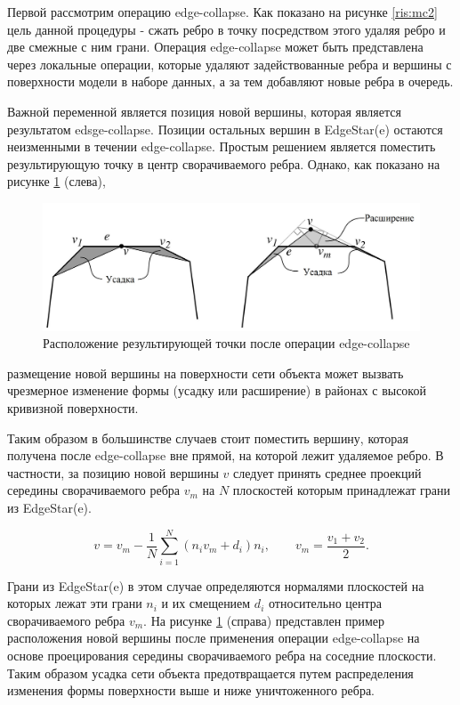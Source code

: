 \documentclass[14pt]{article}
\numberwithin{figure}{section}
\numberwithin{equation}{section}
\begin{document}
Первой рассмотрим операцию edge-collapse. Как показано на рисунке \ref{ris:mc2} цель данной процедуры - сжать ребро в точку посредством этого удаляя ребро и две смежные с ним грани. Операция edge-collapse может быть представлена через локальные операции, которые удаляют задействованные ребра и вершины с поверхности модели в наборе данных, а за тем добавляют новые ребра в очередь.

Важной переменной является позиция новой вершины, которая является результатом edsge-collapse. Позиции остальных вершин в EdgeStar(e) остаются неизменными в течении edge-collapse. Простым решением является поместить результирующую точку в центр сворачиваемого ребра. Однако, как показано на рисунке \ref{ris:mc5} (слева),
\begin{figure}[h]
	\begin{center}
		\includegraphics[scale = 0.47]{mc5.JPG}
		\caption{Расположение результирующей точки после операции edge-collapse}
		\label{ris:mc5}
	\end{center}
\end{figure}
размещение новой вершины на поверхности сети объекта может вызвать чрезмерное изменение формы (усадку или расширение) в районах с высокой кривизной поверхности.

Таким образом в большинстве случаев стоит поместить вершину, которая получена после edge-collapse вне прямой, на которой лежит удаляемое ребро. В частности, за позицию новой вершины $v$ следует принять среднее проекций середины сворачиваемого ребра $v_m$ на $N$ плоскостей которым принадлежат грани из EdgeStar(e).

\begin{equation}
	v = v_m - \frac{1}{N} \sum\limits_{i = 1}^N (n_i v_m + d_i)n_i, \qquad v_m = \frac{v_1 + v_2}{2}.
\end{equation}

Грани из EdgeStar(e) в этом случае определяются нормалями плоскостей на которых лежат эти грани $n_i$ и их смещением $d_i$ относительно центра сворачиваемого ребра $v_m$. На рисунке \ref{ris:mc5} (справа) представлен пример расположения новой вершины после применения операции edge-collapse на основе проецирования середины сворачиваемого ребра на соседние плоскости. Таким образом усадка сети объекта предотвращается путем распределения изменения формы поверхности выше и ниже уничтоженного ребра.
\end{document}
